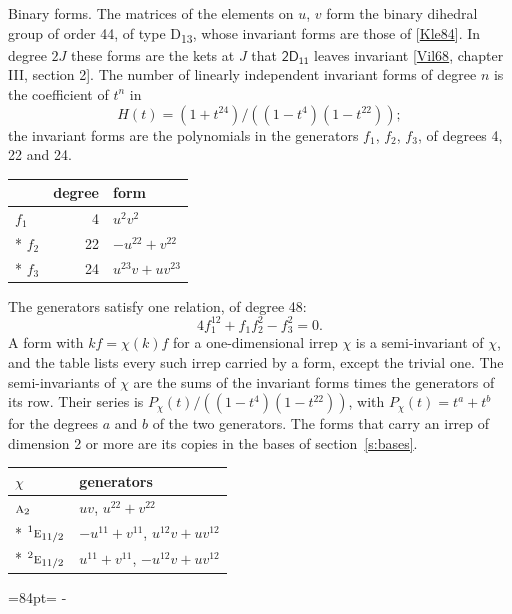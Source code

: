 \documentclass[10pt,a4paper]{article}
\makeatletter
\renewcommand\paragraph{\@startsection{paragraph}{4}{\z@}{1.5ex plus .5ex minus .2ex}{-1em}%
  {\normalfont\small\sffamily\bfseries\color{parttitle}}}
\newcommand{\needspace}[1]{\par\penalty-100\begingroup\dimen0=#1\relax\dimen2=\pagegoal
  \advance\dimen2-\pagetotal\ifdim\dimen0>\dimen2\relax\ifdim\dimen2>0pt\vfil\break\fi\fi
  \endgroup}
\numberwithin{equation}{section}
\newcommand{\grp}[1]{\mathsf{#1}}
\newcommand{\irr}[1]{\text{\normalfont\scshape #1}}
\newcommand{\conjpair}[1]{{}^{#1}}
\makeatother
\begin{document}
\paragraph{Binary forms.}
The matrices of the elements on $u$, $v$ form the binary dihedral group of order 44, of type D\textsubscript{13}, whose invariant forms are those of [\href{../../../REFERENCES.pdf\#ref.Kle84}{Kle84}]. In degree $2J$ these forms are the kets at $J$ that $\grp{2D_{11}}$ leaves invariant [\href{../../../REFERENCES.pdf\#ref.Vil68}{Vil68}, chapter III, section 2]. \label{n:head.degree}\label{n:head.form}The number of linearly independent invariant forms of degree $n$ is the coefficient of $t^n$ in
\begin{equation}\label{e:molien}H(t) = (1 + t^{24})/((1-t^{4})(1-t^{22}));\end{equation}
the invariant forms are the polynomials in the generators $f_1$, $f_2$, $f_3$, of degrees 4, 22 and 24.
{\small\begin{longtable}{@{}lrl@{}}\toprule
& degree & form\\\midrule\endhead
\bottomrule\endfoot\endlastfoot
$f_{1}$ & 4 & $u^{2}v^{2}$\\*
$f_{2}$ & 22 & $-u^{22} + v^{22}$\\*
$f_{3}$ & 24 & $u^{23}v + uv^{23}$\\
\bottomrule\end{longtable}}
The generators satisfy one relation, of degree 48:
\begin{equation}\label{e:relation}4f_{1}^{12} + f_{1}f_{2}^{2} - f_{3}^{2} = 0.\end{equation}
A form with $k f = \chi(k) f$ for a one-dimensional irrep $\chi$ is a semi-invariant of $\chi$, and the table lists every such irrep carried by a form, except the trivial one. \label{n:head.generators}The semi-invariants of $\chi$ are the sums of the invariant forms times the generators of its row. Their series is $P_\chi(t)/((1-t^{4})(1-t^{22}))$, with $P_\chi(t) = t^{a} + t^{b}$ for the degrees $a$ and $b$ of the two generators. The forms that carry an irrep of dimension 2 or more are its copies in the bases of section~\ref{s:bases}.
{\small\begin{longtable}{@{}ll@{}}\toprule
$\chi$ & generators\\\midrule\endhead
\bottomrule\endfoot\endlastfoot
$\irr{a}_{2}$ & $uv$, $u^{22} + v^{22}$\\*
$\conjpair{1}\irr{e}_{11/2}$ & $-u^{11} + v^{11}$, $u^{12}v + uv^{12}$\\*
$\conjpair{2}\irr{e}_{11/2}$ & $u^{11} + v^{11}$, $-u^{12}v + uv^{12}$\\
\bottomrule\end{longtable}}
\needspace{84pt}
\end{document}
